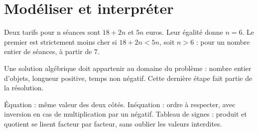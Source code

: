 \documentclass[../cours_2de.tex]{subfiles}
\begin{document}
\section{Modéliser et interpréter}
Deux tarifs pour n séances sont $18+2n$ et $5n$ euros. Leur égalité donne $n=6$. Le premier est strictement moins cher si $18+2n<5n$, soit $n>6$ : pour un nombre entier de séances, à partir de $7$.

Une solution algébrique doit appartenir au domaine du problème : nombre entier d'objets, longueur positive, temps non négatif. Cette dernière étape fait partie de la résolution.
\begin{retenir}
Équation : même valeur des deux côtés. Inéquation : ordre à respecter, avec inversion en cas de multiplication par un négatif. Tableau de signes : produit et quotient se lisent facteur par facteur, sans oublier les valeurs interdites.
\end{retenir}
\end{document}
